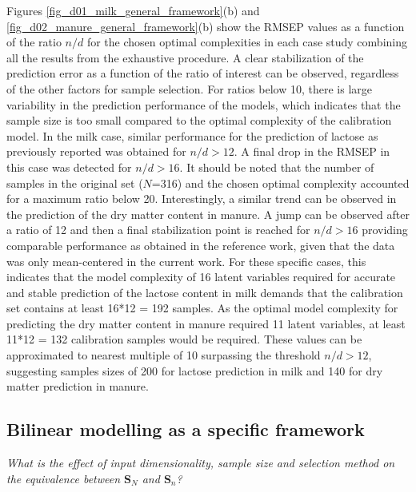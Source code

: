 \documentclass[journal=ancham,manuscript=article]{achemso}
\begin{document}
Figures \ref{fig_d01_milk_general_framework}(b) and \ref{fig_d02_manure_general_framework}(b) show the RMSEP values as a function of the ratio $n/d$ for the chosen optimal complexities in each case study combining all the results from the exhaustive procedure. A clear stabilization of the prediction error as a function of the ratio of interest can be observed, regardless of the other factors for sample selection. For ratios below 10, there is large variability in the prediction performance of the models, which indicates that the sample size is too small compared to the optimal complexity of the calibration model. In the milk case, similar performance for the prediction of lactose as previously reported \cite{Diaz-Olivares2020, Aernouts2011} was obtained for $n/d>12$. A final drop in the RMSEP in this case was detected for $n/d>16$. It should be noted that the number of samples in the original set ($N$=316) and the chosen optimal complexity accounted for a maximum ratio below 20. Interestingly, a similar trend can be observed in the prediction of the dry matter content in manure. A jump can be observed after a ratio of 12 and then a final stabilization point is reached for $n/d>16$ providing comparable performance as obtained in the reference work, given that the data was only mean-centered in the current work\cite{Saeys2005}. For these specific cases, this indicates that the model complexity of 16 latent variables required for accurate and stable prediction of the lactose content in milk demands that the calibration set contains at least 16*12 = 192 samples. As the optimal model complexity for predicting the dry matter content in manure required 11 latent variables, at least 11*12 = 132 calibration samples would be required. These values can be approximated to nearest multiple of 10 surpassing the threshold $n/d>12$, suggesting samples sizes of 200 for lactose prediction in milk and 140 for dry matter prediction in manure.



\subsection{Bilinear modelling as a specific framework}\label{results:specframework}

\emph{What is the effect of input dimensionality, sample size and selection method on the equivalence between $\mathbf{S}_N$ and $\mathbf{S}_n$?} 
\end{document}
